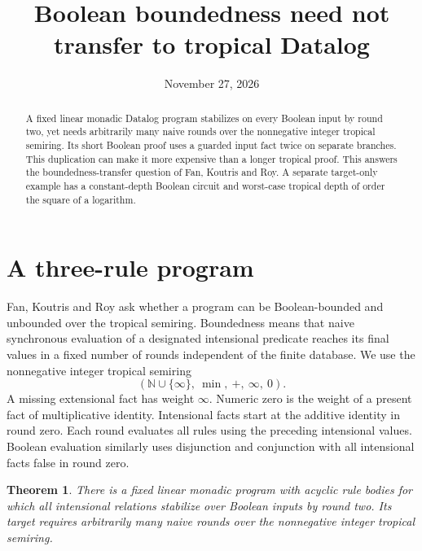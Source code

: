 \documentclass[11pt]{amsart}
\title{Boolean boundedness need not transfer to tropical Datalog}
\date{November 27, 2026}
\newtheorem{theorem}{Theorem}
\begin{document}
\begin{abstract}
A fixed linear monadic Datalog program stabilizes on every
Boolean input by round two, yet needs arbitrarily many naive
rounds over the nonnegative integer tropical semiring. Its
short Boolean proof uses a guarded input fact twice on separate
branches. This duplication can make it more expensive than a
longer tropical proof. This answers the boundedness-transfer
question of Fan, Koutris and Roy. A separate target-only example
has a constant-depth Boolean circuit and worst-case tropical
depth of order the square of a logarithm.
\end{abstract}
\maketitle

\section{A three-rule program}
Fan, Koutris and Roy \cite[Sec.~4, p.~93:10]{fkr} ask whether a
program can be Boolean-bounded and unbounded over the tropical
semiring. Boundedness means that naive synchronous evaluation of
a designated intensional predicate reaches its final values in
a fixed number of rounds independent of the finite database.
We use the nonnegative integer tropical semiring
\[
      (\mathbb N\cup\{\infty\},\ \min,\ +,\ \infty,\ 0).
\]
A missing extensional fact has weight \(\infty\). Numeric zero
is the weight of a present fact of multiplicative identity.
Intensional facts start at the additive identity in round zero.
Each round evaluates all rules using the preceding intensional
values. Boolean evaluation similarly uses disjunction and
conjunction with all intensional facts false in round zero.

\begin{theorem}
There is a fixed linear monadic program with acyclic rule bodies
for which all intensional relations stabilize over Boolean inputs
by round two. Its target requires arbitrarily many naive rounds
over the nonnegative integer tropical semiring.
\end{theorem}
\end{document}
